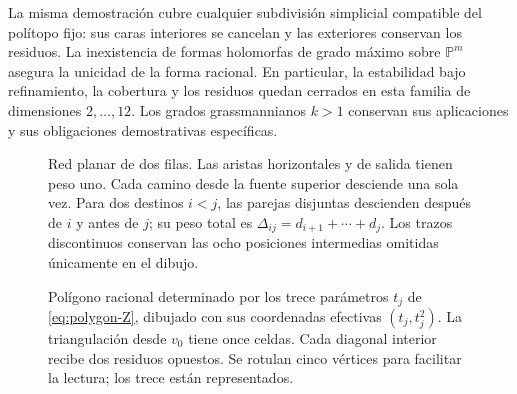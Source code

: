 \documentclass[a4paper,10pt]{article}
\theoremstyle{definition}\newtheorem{definition}[theorem]{Definición}
\theoremstyle{remark}\newtheorem{remark}[theorem]{Observación}
\numberwithin{equation}{section}
\begin{document}
La misma demostración cubre cualquier subdivisión simplicial compatible
del polítopo fijo: sus caras interiores se cancelan y las exteriores
conservan los residuos. La inexistencia de formas holomorfas de grado
máximo sobre \(\mathbb P^m\) asegura la unicidad de la forma racional.
En particular, la estabilidad bajo refinamiento, la cobertura y los
residuos quedan cerrados en esta familia de dimensiones \(2,\ldots,12\).
Los grados grassmannianos \(k>1\) conservan sus aplicaciones y sus
obligaciones demostrativas específicas.

\begin{figure}[htbp]
\centering
{}
\caption{Red planar de dos filas. Las aristas horizontales y de salida
tienen peso uno. Cada camino desde la fuente superior desciende una sola
vez. Para dos destinos \(i<j\), las parejas disjuntas descienden después
de \(i\) y antes de \(j\); su peso total es
\(\Delta_{ij}=d_{i+1}+\cdots+d_j\). Los trazos discontinuos conservan
las ocho posiciones intermedias omitidas únicamente en el dibujo.}
\end{figure}

\begin{figure}[htbp]
\centering
{}
\caption{Polígono racional determinado por los trece parámetros
\(t_j\) de \eqref{eq:polygon-Z}, dibujado con sus coordenadas efectivas
\((t_j,t_j^2)\). La triangulación desde \(v_0\) tiene once celdas.
Cada diagonal interior recibe dos residuos opuestos. Se rotulan cinco
vértices para facilitar la lectura; los trece están representados.}
\end{figure}
\end{document}
